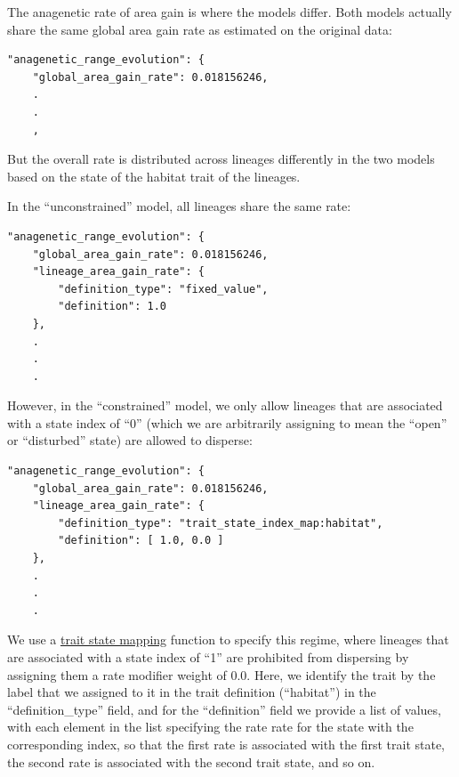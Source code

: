 \documentclass[11pt,openany]{memoir} %
\begin{document}
The anagenetic rate of area gain is where the models differ.
Both models actually share the same global area gain rate as estimated on the original data:
\begin{lstlisting}
"anagenetic_range_evolution": {
    "global_area_gain_rate": 0.018156246,
    .
    .
    ,
\end{lstlisting}
But the overall rate is distributed across lineages differently in the two models based on the state of the habitat trait of the lineages.

In the ``unconstrained'' model, all lineages share the same rate:
\begin{lstlisting}
"anagenetic_range_evolution": {
    "global_area_gain_rate": 0.018156246,
    "lineage_area_gain_rate": {
        "definition_type": "fixed_value",
        "definition": 1.0
    },
    .
    .
    .
\end{lstlisting}

However, in the ``constrained'' model, we only allow lineages that are associated with a state index of ``0'' (which we are arbitrarily assigning to mean the ``open'' or ``disturbed'' state) are allowed to disperse:
\begin{lstlisting}
"anagenetic_range_evolution": {
    "global_area_gain_rate": 0.018156246,
    "lineage_area_gain_rate": {
        "definition_type": "trait_state_index_map:habitat",
        "definition": [ 1.0, 0.0 ]
    },
    .
    .
    .
\end{lstlisting}
We use a \hyperref[sec:trait-state-mapping]{trait state mapping} function to specify this regime, where lineages that are associated with a state index of ``1'' are prohibited from dispersing by assigning them a rate modifier weight of $0.0$.
Here, we identify the trait by the label that we assigned to it in the trait definition (``habitat'') in the ``definition\_type'' field, and for the ``definition'' field we provide a list of values, with each element in the list specifying the rate rate for the state with the corresponding index, so that the first rate is associated with the first trait state, the second rate is associated with the second trait state, and so on.
\end{document}
